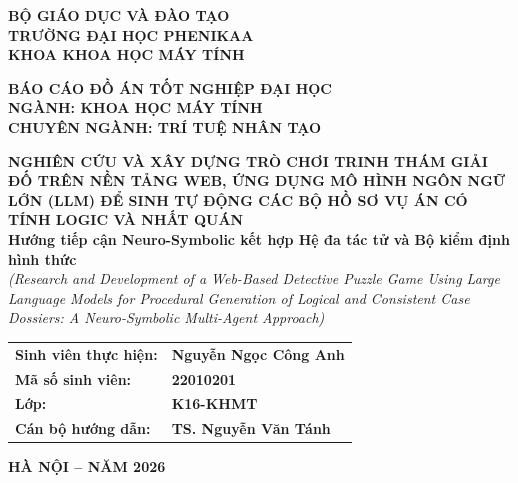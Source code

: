 \begin{titlepage}
\begin{center}
    \textbf{\large BỘ GIÁO DỤC VÀ ĐÀO TẠO}\\[0.25cm]
    \textbf{\large TRƯỜNG ĐẠI HỌC PHENIKAA}\\[0.25cm]
    \textbf{\large KHOA KHOA HỌC MÁY TÍNH}\\[0.8cm]

    \vspace{0.8cm} %

    \textbf{\Large BÁO CÁO ĐỒ ÁN TỐT NGHIỆP ĐẠI HỌC}\\[0.3cm]
    \textbf{\large NGÀNH: KHOA HỌC MÁY TÍNH}\\[0.2cm]
    \textbf{\large CHUYÊN NGÀNH: TRÍ TUỆ NHÂN TẠO}\\[0.8cm]

    \begin{onehalfspace}
        {\bfseries\large NGHIÊN CỨU VÀ XÂY DỰNG TRÒ CHƠI TRINH THÁM GIẢI ĐỐ TRÊN NỀN TẢNG WEB, ỨNG DỤNG MÔ HÌNH NGÔN NGỮ LỚN (LLM) ĐỂ SINH TỰ ĐỘNG CÁC BỘ HỒ SƠ VỤ ÁN CÓ TÍNH LOGIC VÀ NHẤT QUÁN}\\[0.35cm]
        {\normalsize\textbf{Hướng tiếp cận Neuro-Symbolic kết hợp Hệ đa tác tử và Bộ kiểm định hình thức}}\\[0.25cm]
        {\small\textit{(Research and Development of a Web-Based Detective Puzzle Game Using Large Language Models for Procedural Generation of Logical and Consistent Case Dossiers: A Neuro-Symbolic Multi-Agent Approach)}}
    \end{onehalfspace}

    \vfill

    \begin{table}[h]
        \centering
        \begin{tabular}{ll}
            \textbf{Sinh viên thực hiện:} & \textbf{Nguyễn Ngọc Công Anh} \\
            \textbf{Mã số sinh viên:}     & \textbf{22010201} \\
            \textbf{Lớp:}                & \textbf{K16-KHMT} \\
            \textbf{Cán bộ hướng dẫn:}    & \textbf{TS. Nguyễn Văn Tánh}
        \end{tabular}
    \end{table}

    \vspace{0.4cm}
    \textbf{\large HÀ NỘI – NĂM 2026}
\end{center}
\end{titlepage}

